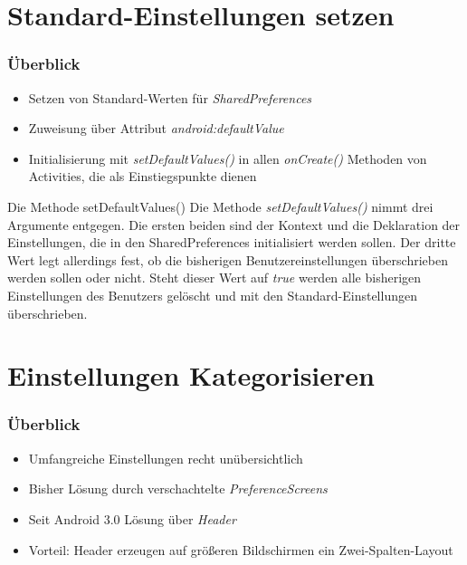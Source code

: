 \section{Standard-Einstellungen setzen}
\begin{frame}
   \frametitle{Überblick}
   \begin{itemize}
      \item Setzen von Standard-Werten für \emph{SharedPreferences}
      \item Zuweisung über Attribut \emph{android:defaultValue}
      \item Initialisierung mit \emph{setDefaultValues()} in allen \emph{onCreate()} 
      	Methoden von Activities, die als Einstiegspunkte dienen
   \end{itemize}

   

   \begin{alertblock}{Die Methode setDefaultValues()}
      Die Methode \emph{setDefaultValues()} nimmt drei Argumente entgegen. 
      Die ersten beiden sind der Kontext und die Deklaration 
      der Einstellungen, die in den SharedPreferences initialisiert werden sollen. 
      Der dritte Wert legt allerdings fest, ob die bisherigen Benutzereinstellungen 
      überschrieben werden sollen oder nicht. Steht dieser Wert auf \emph{true} 
      werden alle bisherigen Einstellungen des Benutzers gelöscht und mit den 
      Standard-Einstellungen überschrieben.
   \end{alertblock}
\end{frame}

\section{Einstellungen Kategorisieren}
\begin{frame}
   \frametitle{Überblick}
   \begin{itemize}
      \item Umfangreiche Einstellungen recht unübersichtlich
      \item Bisher Lösung durch verschachtelte \emph{PreferenceScreens}
      \item Seit Android 3.0 Lösung über \emph{Header}
      \item Vorteil: Header erzeugen auf größeren Bildschirmen ein Zwei-Spalten-Layout
   \end{itemize}

   
\end{frame}

